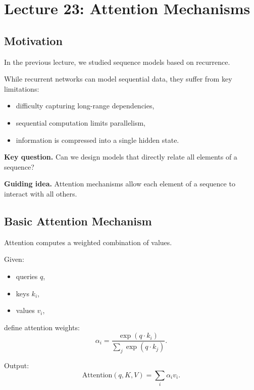 \section{Lecture 23: Attention Mechanisms}

\subsection{Motivation}

In the previous lecture, we studied sequence models based on recurrence.

\medskip

\noindent
While recurrent networks can model sequential data, they suffer from key limitations:

\begin{itemize}
    \item difficulty capturing long-range dependencies,
    \item sequential computation limits parallelism,
    \item information is compressed into a single hidden state.
\end{itemize}

\medskip

\noindent
\textbf{Key question.}  
Can we design models that directly relate all elements of a sequence?

\medskip

\noindent
\textbf{Guiding idea.}  
Attention mechanisms allow each element of a sequence to interact with all others.

\subsection{Basic Attention Mechanism}

Attention computes a weighted combination of values.

\medskip

\noindent
Given:
\begin{itemize}
    \item queries $q$,
    \item keys $k_i$,
    \item values $v_i$,
\end{itemize}

define attention weights:
\[
\alpha_i = \frac{\exp(q \cdot k_i)}{\sum_j \exp(q \cdot k_j)}.
\]

\medskip

\noindent
Output:
\[
\text{Attention}(q, K, V) = \sum_i \alpha_i v_i.
\]

